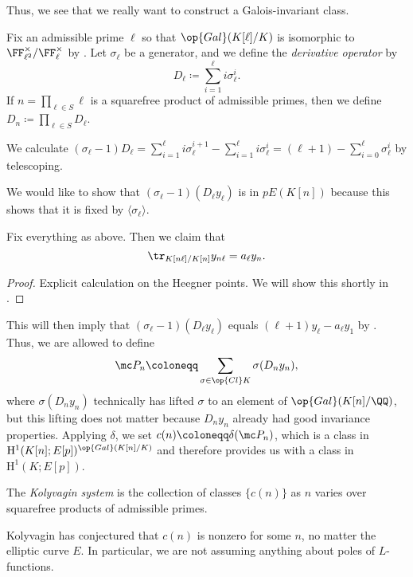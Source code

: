 \documentclass[../notes.tex]{subfiles}
\begin{document}
Thus, we see that we really want to construct a Galois-invariant class.
\begin{definition}
	Fix an admissible prime $\ell$ so that $\op{Gal}(K[\ell]/K)$ is isomorphic to $\FF_{\ell^2}^\times/\FF_\ell^\times$ by . Let $\sigma_\ell$ be a generator, and we define the \textit{derivative operator} by
	\[D_\ell\coloneqq\sum_{i=1}^\ell i\sigma_\ell^i.\]
	If $n=\prod_{\ell\in S}\ell$ is a squarefree product of admissible primes, then we define $D_n\coloneqq\prod_{\ell\in S}D_\ell$.
\end{definition}
\begin{example} \label{ex:derivative-calculation}
	We calculate $(\sigma_\ell-1)D_\ell=\sum_{i=1}^\ell i\sigma_\ell^{i+1}-\sum_{i=1}^\ell i\sigma_\ell^i=(\ell+1)-\sum_{i=0}^\ell\sigma_\ell^i$ by telescoping.
\end{example}
We would like to show that $(\sigma_\ell-1)(D_\ell y_\ell)$ is in $pE(K[n])$ because this shows that it is fixed by $\langle\sigma_\ell\rangle$.
\begin{lemma}
	Fix everything as above. Then we claim that
	\[\tr_{K[n\ell]/K[n]}y_{n\ell}=a_\ell y_n.\]
\end{lemma}
\begin{proof}
	Explicit calculation on the Heegner points. We will show this shortly in .
\end{proof}
This will then imply that $(\sigma_\ell-1)(D_\ell y_\ell)$ equals $(\ell+1)y_\ell-a_\ell y_1$ by . Thus, we are allowed to define
\[\mc P_n\coloneqq\sum_{\sigma\in\op{Cl}K}\sigma(D_ny_n),\]
where $\sigma(D_ny_n)$ technically has lifted $\sigma$ to an element of $\op{Gal}(K[n]/\QQ)$, but this lifting does not matter because $D_ny_n$ already had good invariance properties. Applying $\delta$, we set $c(n)\coloneqq\delta(\mc P_n)$, which is a class in $\mathrm H^1(K[n];E[p])^{\op{Gal}(K[n]/K)}$ and therefore provides us with a class in $\mathrm H^1(K;E[p])$.
\begin{definition}
	The \textit{Kolyvagin system} is the collection of classes $\{c(n)\}$ as $n$ varies over squarefree products of admissible primes.
\end{definition}
\begin{remark}
	Kolyvagin has conjectured that $c(n)$ is nonzero for some $n$, no matter the elliptic curve $E$. In particular, we are not assuming anything about poles of $L$-functions.
\end{remark}

\end{document}
